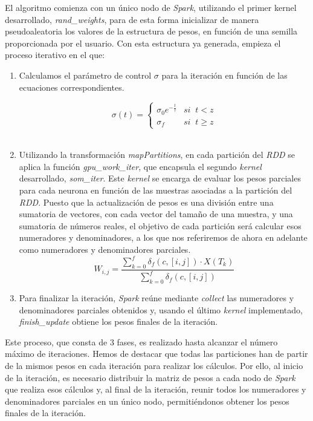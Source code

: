 El algoritmo comienza con un  único nodo de \textit{Spark}, utilizando el primer kernel desarrollado, \textit{rand\_weights}, para de esta forma inicializar de manera pseudoaleatoria los valores de la estructura de pesos, en función de una semilla proporcionada por el usuario. Con esta estructura ya generada, empieza el proceso iterativo en el que:
\begin{enumerate}
    \item Calculamos el parámetro de control $\sigma$ para la iteración en función de las ecuaciones correspondientes.

$$\sigma(t) = \left\{
\begin{array}{ll}
\sigma_0e^{-\frac{t}{\tau}} & si \;\;t < z\\
\sigma_f & si  \;\; t\geq z
\end{array}
\right.
$$\\
    \item Utilizando la transformación \textit{mapPartitions}, en cada partición del \textit{RDD} se aplica la función \textit{gpu\_work\_iter}, que encapsula el segundo  \textit{kernel} desarrollado, \textit{som\_iter}. Este \textit{kernel} se encarga de evaluar los pesos parciales para cada neurona en función de las muestras asociadas a la partición del \textit{RDD}. Puesto que la actualización de pesos es una división entre una sumatoria de vectores, con cada vector del tamaño de una muestra, y una sumatoria de números reales, el objetivo de cada partición será calcular esos numeradores y denominadores, a los que nos referiremos de ahora en adelante como numeradores y denominadores parciales.
    $$
 W_{i, j} = \frac{\sum_{k=0}^{f} \delta_f(c, [i,j]) \cdot  X(T_k) }{\sum_{k=0}^{f} \delta_f(c, [i,j])}
$$
    \item Para finalizar la iteración, \textit{Spark} reúne mediante \textit{collect} las numeradores y denominadores parciales obtenidos y, usando el último \textit{kernel} implementado, \textit{finish\_update} obtiene los pesos finales de la iteración.\\
\end{enumerate}

Este proceso, que consta de 3 fases, es realizado hasta alcanzar el número máximo de iteraciones. Hemos de destacar que todas las particiones han de partir de la mismos pesos en cada iteración para realizar los cálculos. Por ello, al inicio de la iteración, es necesario distribuir la matriz de pesos a cada nodo de \textit{Spark} que realiza esos cálculos y, al final de la iteración, reunir todos los numeradores y denominadores parciales en un único nodo, permitiéndonos obtener los pesos finales de la iteración. \\

